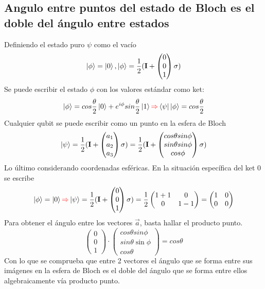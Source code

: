 \documentclass{book}
\begin{document}
\subsection{Angulo entre puntos del estado de Bloch es el doble del ángulo entre estados} Definiendo el estado puro $\psi$ como el vacío
$$ \ket{\phi}=\ket{0},\ket{\phi}=\frac{1}{2}(\mathbf{I}+\begin{pmatrix}0\\0\\1\end{pmatrix}\sigma)$$ Se puede escribir el estado $\phi$ con los valores estándar como ket:
$$ \ket{\phi}=cos\frac{\theta}{2}\ket{0}+e^{i\phi}sin\frac{\theta}{2}\ket{1} \textcolor{red}{\Rightarrow} \bra{\psi}\ket{\phi}=cos\frac{\theta}{2}$$
Cualquier qubit se puede escribir como un punto en la esfera de Bloch
$$ \ket{\psi}=\frac{1}{2}(\mathbf{I}+\begin{pmatrix}a_1\\a_2\\a_3\end{pmatrix}\sigma)=\frac{1}{2}(\mathbf{I}+\begin{pmatrix}cos\theta sin \phi \\sin\theta sin\phi \\cos\phi \end{pmatrix}\sigma)$$
Lo último considerando coordenadas esféricas. En la situación específica del ket 0 se escribe
$$  \ket{\phi}=\ket{0} \textcolor{red}{\Rightarrow}  \ket{\psi}=\frac{1}{2}(\mathbf{I}+\begin{pmatrix}0\\0\\1\end{pmatrix}\sigma)=\frac{1}{2}\begin{pmatrix} 1+1 & 0 \\ 0 & 1-1\end{pmatrix}=\begin{pmatrix} 1&0\\ 0&0 \end{pmatrix}$$Para obtener el ángulo entre los vectores $\vec{a}$, basta hallar el producto punto.
$$\begin{pmatrix} 0\\ 0\\ 1\end{pmatrix}\cdot\begin{pmatrix}cos\theta sin\phi\\ sin\theta\sin\phi \\ cos\theta\end{pmatrix}=cos\theta $$
Con lo que se comprueba que entre 2 vectores el ángulo que se forma entre sus imágenes en la esfera de Bloch es el doble del ángulo que se forma entre ellos algebraicamente vía producto punto.
\end{document}
